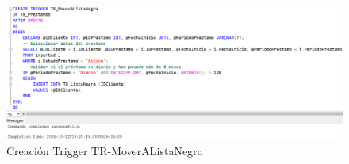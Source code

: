 \begin{figure}[H]
  \centering
  \includegraphics[scale = 0.3]{Imagenes/SQL/3.Triggers/TR_MoverAListaNegra.png}
  \caption{Creación Trigger TR-MoverAListaNegra}
\end{figure}